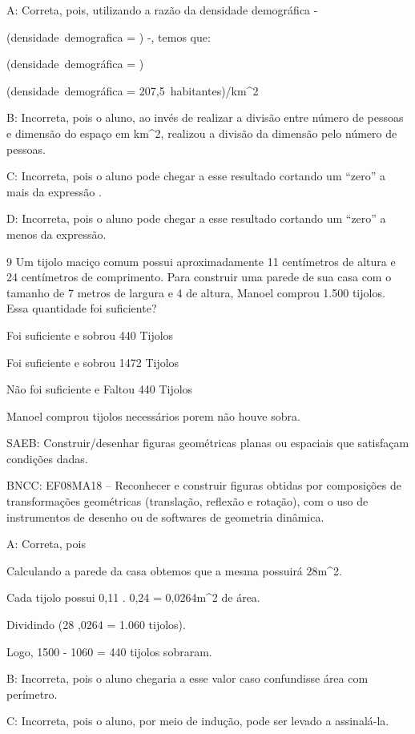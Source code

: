 {A: Correta, pois, utilizando a razão da densidade demográfica -

(densidade\ demografica = )
-, temos que:

(densidade\ demográfica = )

(densidade\ demográfica = 207,5\ habitantes)/km^2

B: Incorreta, pois o aluno, ao invés de realizar a divisão entre número
de pessoas e dimensão do espaço em km^2, realizou a divisão da dimensão
pelo número de pessoas.

C: Incorreta, pois o aluno pode chegar a esse resultado cortando um
``zero'' a mais da expressão .

D: Incorreta, pois o aluno pode chegar a esse resultado cortando um
``zero'' a menos da expressão.

\num{9} Um tijolo maciço comum possui aproximadamente 11 centímetros de
altura e 24 centímetros de comprimento. Para construir uma parede de sua
casa com o tamanho de 7 metros de largura e 4 de altura, Manoel comprou
1.500 tijolos. Essa quantidade foi suficiente?
\item Foi suficiente e sobrou 440 Tijolos
\item Foi suficiente e sobrou 1472 Tijolos
\item Não foi suficiente e Faltou 440 Tijolos
\item Manoel comprou tijolos necessários porem não houve sobra.

SAEB: Construir/desenhar figuras geométricas planas ou espaciais que
satisfaçam condições dadas.

BNCC: EF08MA18 -- Reconhecer e construir figuras obtidas por composições
de transformações geométricas (translação, reflexão e rotação), com o
uso de instrumentos de desenho ou de softwares de geometria dinâmica.

A: Correta, pois

Calculando a parede da casa obtemos que a mesma possuirá 28m^2.

Cada tijolo possui 0,11 . 0,24 = 0,0264m^2 de área.

Dividindo (28 ,0264 = 1.060\; tijolos).

Logo, 1500 - 1060 = 440 tijolos sobraram.

B: Incorreta, pois o aluno chegaria a esse valor caso confundisse área
com perímetro.

C: Incorreta, pois o aluno, por meio de indução, pode ser levado a
assinalá-la.

}
